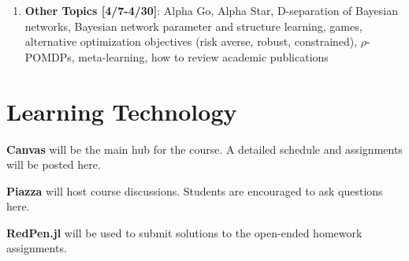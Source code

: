 \documentclass[10pt]{article}
\begin{document}
\begin{enumerate}[noitemsep]
        \begin{multicols}{2}
        \begin{itemize}[noitemsep]
            \item Hidden Markov models
            \item Bayesian filters
            \item Particle filters
            \item Partially observable Markov decision processes (POMDPs)
            \item Exact POMDP methods
            \item Convexity of POMDP value functions
            \item Offline POMDP methods
            \item Online POMDP methods
            \item QMDP
        \end{itemize}
        \end{multicols}
    \item \textbf{Other Topics [4/7-4/30]}: Alpha Go, Alpha Star, D-separation of Bayesian networks, Bayesian network parameter and structure learning, games, alternative optimization objectives (risk averse, robust, constrained), $\rho$-POMDPs, meta-learning, how to review academic publications
\end{enumerate}

\begin{minipage}{\textwidth}
\section*{Learning Technology}

\textbf{Canvas} will be the main hub for the course. A detailed schedule and assignments will be posted here.

\textbf{Piazza} will host course discussions. Students are encouraged to ask questions here.

\textbf{RedPen.jl} will be used to submit solutions to the open-ended homework assignments.
\end{minipage}
\end{document}
